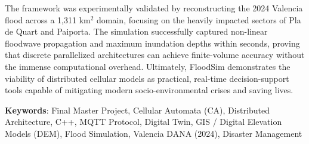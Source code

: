 The framework was experimentally validated by reconstructing the 2024 Valencia flood across a 1,311 km$^2$ domain, focusing on the heavily 
impacted sectors of Pla de Quart and Paiporta. The simulation successfully captured non-linear floodwave propagation and maximum inundation 
depths within seconds, proving that discrete parallelized architectures can achieve finite-volume accuracy without the immense computational 
overhead. Ultimately, FloodSim demonstrates the viability of distributed cellular models as practical, real-time decision-support tools 
capable of mitigating modern socio-environmental crises and saving lives.

\vspace{1.5cm}

\textbf{Keywords}: Final Master Project, Cellular Automata (CA), Distributed Architecture, C++, MQTT Protocol, Digital Twin, GIS / Digital Elevation Models (DEM), Flood Simulation, Valencia DANA (2024), Disaster Management